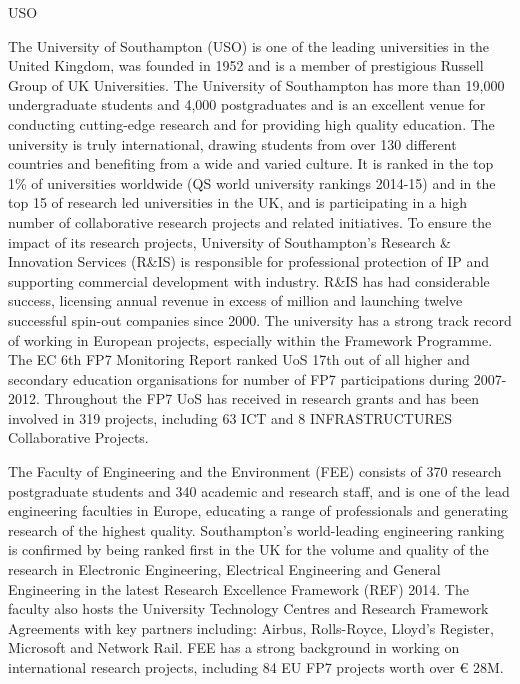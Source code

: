 \begin{sitedescription}{USO}





  The University of Southampton (USO) is one of the leading
  universities in the United Kingdom, was founded in 1952 and is a
  member of prestigious Russell Group of UK Universities. The
  University of Southampton has more than 19,000 undergraduate
  students and 4,000 postgraduates and is an excellent venue for
  conducting cutting-edge research and for providing high quality
  education. The university is truly international, drawing students
  from over 130 different countries and benefiting from a wide and
  varied culture. It is ranked in the top 1\% of universities
  worldwide (QS world university rankings 2014-15) and in the top 15
  of research led universities in the UK, and is participating in a
  high number of collaborative research projects and related
  initiatives. To ensure the impact of its research projects,
  University of Southampton’s Research \& Innovation Services (R\&IS)
  is responsible for professional protection of IP and supporting
  commercial development with industry. R\&IS has had considerable
  success, licensing annual revenue in excess of million and
  launching twelve successful spin-out companies since 2000.  The
  university has a strong track record of working in European
  projects, especially within the Framework Programme. The EC 6th FP7
  Monitoring Report ranked UoS 17th out of all higher and secondary
  education organisations for number of FP7 participations during
  2007-2012. Throughout the FP7 UoS has received  in
  research grants and has been involved in 319 projects, including 63
  ICT and 8 INFRASTRUCTURES Collaborative Projects. 

  The Faculty of Engineering and the Environment (FEE) consists of 370
  research postgraduate students and 340 academic and research
  staff, and is one of the lead engineering faculties in Europe, educating
  a range of professionals and generating research of the highest
  quality. Southampton's world-leading engineering ranking is
  confirmed by being ranked first in the UK for the volume and quality
  of the research in Electronic Engineering, Electrical Engineering
  and General Engineering in the latest Research Excellence Framework
  (REF) 2014. The faculty also hosts the University Technology Centres
  and Research Framework Agreements with key partners including:
  Airbus, Rolls-Royce, Lloyd’s Register, Microsoft and Network
  Rail. FEE has a strong background in working on international
  research projects, including 84 EU FP7 projects worth over \euro
  28M.



\end{sitedescription}
